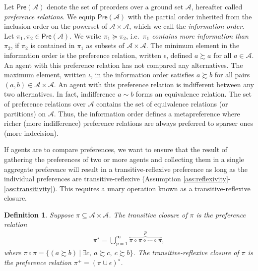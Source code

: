 \documentclass[conference]{ieeeconf}
\newcommand{\powerset}[1]{2^{#1}}
\newcommand{\A}{\mathcal{A}}
\newcommand{\X}{\mathcal{X}}
\newcommand{\Pref}{\mathsf{Pre}}
\newcommand{\prefers}{\succsim}
\DeclareMathOperator{\cl}{cl}
\DeclareMathOperator{\Cl}{Cl}
\newtheorem{definition}{Definition}
\begin{document}
Let $\Pref(\A)$ denote the set of preorders over a ground set $\A$, hereafter called \emph{preference relations}. We equip $\Pref(\A)$ with the partial order inherited from the inclusion order on the powerset of $\A \times \A$, which we call the \emph{information order}. Let $\pi_1, \pi_2 \in \Pref(\A)$. We write $\pi_1 \succeq \pi_2$, i.e.~{\it $\pi_1$ contains more information than $\pi_2$}, if $\pi_2$ is contained in $\pi_1$ as subsets of $\A \times \A$. The minimum element in the information order is the preference relation, written $\epsilon$, defined $a \prefers a$ for all $a \in \A$. An agent with this preference relation has not compared any alternatives. The maximum element, written $\iota$, in the information order satisfies $a \prefers b$ for all pairs $(a,b) \in \A \times \A$. An agent with this preference relation is indifferent between any two alternatives. In fact, indifference $a \sim b$ forms an equivalence relation. The set of preference relations over $\A$ contains the set of equivalence relations (or partitions) on $\A$. Thus, the information order defines a metapreference where richer (more indifference) preference relations are always preferred to sparser ones (more indecision).

If agents are to compare preferences, we want to ensure that the result of gathering the preferences of two or more agents and collecting them in a single aggregate preference will result in a transitive-reflexive preference as long as the individual preferences are transitive-reflexive (Assumption \ref{ass:reflexivity}-\ref{ass:transitivity}). This requires a unary operation known as a transitive-reflexive closure.
\begin{definition}
    Suppose $\pi \subseteq \A \times \A$. The \emph{transitive closure} of $\pi$ is the preference relation 
\begin{align}
    \pi^{\star} = \bigcup_{p=1}^{\infty} \overbrace{\pi \circ \pi \circ \cdots \circ \pi}^{p}, \label{eq:transitive-closure}
\end{align}
where $\pi \circ \pi = \{ (a \prefers b)~\vert~\exists c,~a \prefers c,~c \prefers b\}$. The \emph{transitive-reflexive closure} of $\pi$ is the preference relation $\pi^{+} = \left( \pi \cup \epsilon \right)^\star$.
\end{definition}

\end{document}
